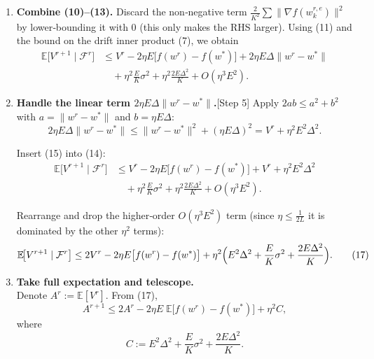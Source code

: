 \documentclass{article}
\newcommand{\E}{\mathbb{E}}
\begin{document}
\begin{enumerate}
Thus,
\[
|f(w_{k}^{r,e})-f(w^{r})|\le L\|w_{k}^{r,e}-w^{r}\|\|w_{k}^{r,e}-w^{r}\|
\le L(E\eta G)^{2}.
\tag{13}
\]

Summing (13) over $k,e$ and dividing by $K$ yields a bound of order $L\eta^{2}E^{2}G^{2}$, which will be absorbed into the $O(\eta\Delta^{2}E)$ term.  Hence we replace $f(w_{k}^{r,e})$ by $f(w^{r})$ up to a negligible $O(\eta^{2})$ error.

\item \textbf{Combine (10)–(13).}  
Discard the non‑negative term $\frac{2}{K^{2}}\sum\|\nabla f(w_{k}^{r,e})\|^{2}$ by lower‑bounding it with $0$ (this only makes the RHS larger).  Using (11) and the bound on the drift inner product (7), we obtain
\[
\begin{aligned}
\E\!\bigl[V^{r+1}\mid\mathcal{F}^{r}\bigr]
&\le V^{r}
-2\eta E\bigl[f(w^{r})-f(w^{*})\bigr]
+2\eta E\Delta\|w^{r}-w^{*}\|\\
&\quad+\eta^{2}\frac{E}{K}\sigma^{2}
+\eta^{2}\frac{2E\Delta^{2}}{K}
+O(\eta^{3}E^{2}).
\tag{14}
\end{aligned}
\]

\item \textbf{Handle the linear term $2\eta E\Delta\|w^{r}-w^{*}\|$.}[Step 5]  
Apply $2ab\le a^{2}+b^{2}$ with $a=\|w^{r}-w^{*}\|$ and $b= \eta E\Delta$:
\[
2\eta E\Delta\|w^{r}-w^{*}\|
\le \|w^{r}-w^{*}\|^{2}+(\eta E\Delta)^{2}
= V^{r}+ \eta^{2}E^{2}\Delta^{2}.
\tag{15}
\]

Insert (15) into (14):
\[
\begin{aligned}
\E\!\bigl[V^{r+1}\mid\mathcal{F}^{r}\bigr]
&\le V^{r}
-2\eta E\bigl[f(w^{r})-f(w^{*})\bigr]
+V^{r}+ \eta^{2}E^{2}\Delta^{2}\\
&\quad+\eta^{2}\frac{E}{K}\sigma^{2}
+\eta^{2}\frac{2E\Delta^{2}}{K}
+O(\eta^{3}E^{2}).
\end{aligned}
\tag{16}
\]

Rearrange and drop the higher‑order $O(\eta^{3}E^{2})$ term (since $\eta\le\frac1{2L}$ it is dominated by the other $\eta^{2}$ terms):
\[
\E\!\bigl[V^{r+1}\mid\mathcal{F}^{r}\bigr]
\le 2V^{r}
-2\eta E\bigl[f(w^{r})-f(w^{*})\bigr]
+\eta^{2}\Bigl(E^{2}\Delta^{2}
+\frac{E}{K}\sigma^{2}
+\frac{2E\Delta^{2}}{K}\Bigr).
\tag{17}
\]

\item \textbf{Take full expectation and telescope.}\\
Denote $A^{r}:=\E[V^{r}]$.  From (17),
\[
A^{r+1}\le 2A^{r}
-2\eta E\;\E\!\bigl[f(w^{r})-f(w^{*})\bigr]
+\eta^{2}C,
\]
where
\[
C:=E^{2}\Delta^{2}+ \frac{E}{K}\sigma^{2}+ \frac{2E\Delta^{2}}{K}.
\tag{18}
\]


\end{enumerate}
\end{document}
